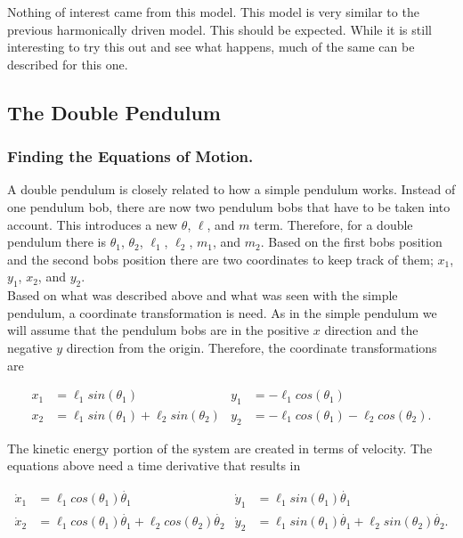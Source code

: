 \documentclass[runningheads]{llncs}
\begin{document}
Nothing of interest came from this model. This model is very similar to the previous harmonically driven model. This should be expected. While it is still interesting to try this out and see what happens, much of the same can be described for this one.


%
%
\subsection{The Double Pendulum}



\subsubsection{Finding the Equations of Motion.}

A double pendulum is closely related to how a simple pendulum works. Instead of one pendulum bob, there are now two pendulum bobs that have to be taken into account. This introduces a new $\theta$, $\ell$, and $m$ term. Therefore, for a double pendulum there is $\theta_{1}$, $\theta_{2}$, $\ell_{1}$, $\ell_{2}$, $m_{1}$, and $m_{2}$. Based on the first bobs position and the second bobs position there are two coordinates to keep track of them; $x_{1}$, $y_{1}$, $x_{2}$, and $y_{2}$. \\

Based on what was described above and what was seen with the simple pendulum, a coordinate transformation is need. As in the simple pendulum we will assume that the pendulum bobs are in the positive $x$ direction and the negative $y$ direction from the origin. Therefore, the coordinate transformations are

\begin{align*}
 x_{1} &= \ell_{1} sin(\theta_{1}) & y_{1} &= -\ell_{1} cos(\theta_{1}) \\
 x_{2} &= \ell_{1} sin(\theta_{1}) + \ell_{2} sin(\theta_{2}) & y_{2} &= -\ell_{1} cos(\theta_{1}) -\ell_{2} cos(\theta_{2}).
\end{align*}

The kinetic energy portion of the system are created in terms of velocity. The equations above need a time derivative that results in

\begin{align*}
 \dot{x}_{1} &= \ell_{1} cos(\theta_{1})\dot{\theta_{1}} & \dot{y}_{1} &= \ell_{1} sin(\theta_{1})\dot{\theta_{1}} \\
 \dot{x}_{2} &= \ell_{1} cos(\theta_{1})\dot{\theta_{1}} + \ell_{2} cos(\theta_{2})\dot{\theta_{2}} & \dot{y}_{2} &= \ell_{1} sin(\theta_{1})\dot{\theta_{1}} + \ell_{2} sin(\theta_{2})\dot{\theta_{2}}.
\end{align*}
\end{document}
